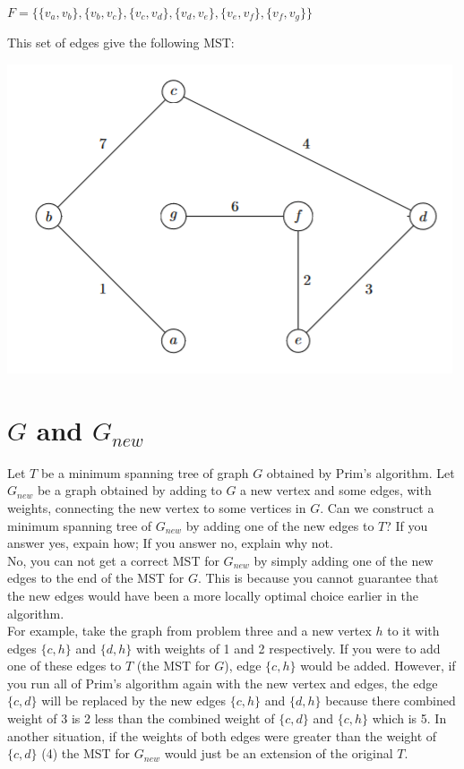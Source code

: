 \documentclass[11pt]{article}
\begin{document}
\begin{center}
$F = \{\{v_a, v_b\}, \{v_b, v_c\}, \{v_c, v_d\}, \{v_d, v_e\}, \{v_e, v_f\}, \{v_f, v_g\}\}$
\end{center}

\bigskip

\noindent This set of edges give the following MST:

\begin{center}
\includegraphics{Q3A.png}
\end{center}

\bigskip
\bigskip

\section{$G$ and $G_{new}$} %
Let $T$ be a minimum spanning tree of graph $G$ obtained by Prim's algorithm. Let $G_{new}$ be a graph obtained by adding to $G$ a new vertex and some edges, with weights, connecting the new vertex to some vertices in $G$. Can we construct a minimum spanning tree of $G_{new}$ by adding one of the new edges to $T$? If you answer yes, expain how; If you answer no, explain why not. \\

\bigskip
No, you can not get a correct MST for $G_{new}$ by simply adding one of the new edges to the end of the MST for $G$. This is because you cannot guarantee that the new edges would have been a more locally optimal choice earlier in the algorithm. \\

For example, take the graph from problem three and a new vertex $h$ to it with edges $\{c, h\}$ and $\{d, h\}$ with weights of 1 and 2 respectively. If you were to add one of these edges to $T$ (the MST for $G$), edge  $\{c, h\}$ would be added. However, if you run all of Prim's algorithm again with the new vertex and edges, the edge $\{c, d\}$ will be replaced by the new edges $\{c, h\}$ and $\{d, h\}$ because there combined weight of 3 is 2 less than the combined weight of $\{c, d\}$ and $\{c, h\}$ which is 5. In another situation, if the weights of both edges were greater than the weight of $\{c, d\}$ (4) the MST for $G_{new}$ would just be an extension of the original $T$.\\
\end{document}
